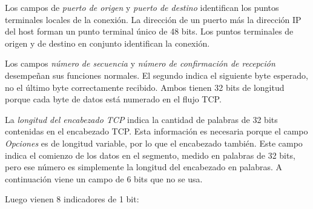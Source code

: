 \documentclass[10pt,a4paper]{report}
\begin{document}
\par Los campos de \textit{puerto de origen} y \textit{puerto de destino} identifican 
los puntos terminales locales de la conexión. La dirección de un puerto más la dirección 
IP del host forman un punto terminal único de 48 bits. Los puntos terminales de origen 
y de destino en conjunto identifican la conexión.
\par Los campos \textit{número de secuencia} y \textit{número de confirmación de 
recepción} desempeñan sus funciones normales. El segundo indica el siguiente byte 
esperado, no el último byte correctamente recibido. Ambos tienen 32 bits de longitud porque cada byte de datos está numerado en el flujo TCP.
\par La \textit{longitud del encabezado TCP} indica la cantidad de palabras de 32 
bits contenidas en el encabezado TCP. Esta información es necesaria porque el campo 
\textit{Opciones} es de longitud variable, por lo que el encabezado también. Este 
campo indica el comienzo de los datos en el segmento, medido en palabras de 32 bits, 
pero ese número es simplemente la longitud del encabezado en palabras. A 
continuación viene un campo de 6 bits que no se usa.
\par Luego vienen 8 indicadores de 1 bit:
\end{document}
